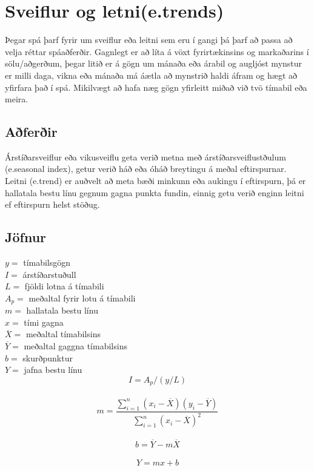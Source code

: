 \section {Sveiflur og letni(e.trends)}
 
Þegar spá þarf fyrir um sveiflur eða leitni sem eru í gangi þá þarf að passa að velja réttar spáaðferðir. Gagnlegt er að líta á vöxt fyrirtækinsins og markaðarins í sölu/aðgerðum, þegar litið er á gögn um mánaða eða árabil og augljóst mynstur er milli daga, vikna eða mánaða má áætla að mynstrið haldi áfram og hægt að yfirfara það í spá. Mikilvægt að hafa næg gögn yfirleitt miðað við tvö tímabil eða meira. \cite{WhatIsTrendForecasting}

\subsection{Aðferðir}
Árstíðarsveiflur eða vikusveiflu geta verið metna með árstíðarsveiflustðulum (e.seasonal index), getur verið háð eða óháð breytingu á meðal eftirspurnar. Leitni (e.trend) er auðvelt að meta bæði minkunn eða aukingu í eftirspurn, þá er hallatala bestu línu gegnum gagna punkta fundin, einnig getu verið enginn leitni ef eftirspurn helst stöðug.\cite{TrendLine}


\subsection{Jöfnur}

	$y=$ tímabilsgögn \\
	$I=$ árstíðarstuðull \\
	$L=$ fjöldi lotna á tímabili \\
	$A_p=$ meðaltal fyrir lotu á tímabili \\
	$m=$ hallatala bestu línu \\
	$x=$ tími gagna \\
	$\overline{X} = $ meðaltal tímabilsins \\
	$\overline{Y}= $ meðaltal gaggna tímabilsins \\
	$ b= $ skurðpunktur \\
	$ Y= $ jafna bestu línu \\

	$$ I=  A_p/(y/L) $$ \\
	$$ m= \frac{\sum_{i=1}^{n} (x_{i}-\overline{X})(y_{i}-\overline{Y})}{\sum_{i=1}^{n} (x_{i}-\overline{X})^{2}} $$ \\	
	$$ b=  \overline {Y} -m\overline{X} $$ \\
	$$ Y=  mx+b $$ \\

%